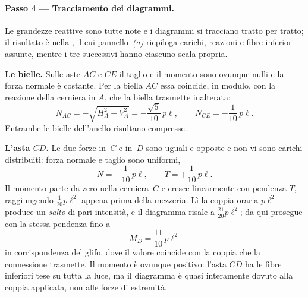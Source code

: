 \begin{esercizio}
\begin{svolgimento}


		
		\paragraph{Passo 4 --- Tracciamento dei diagrammi.}
		
		Le grandezze reattive sono tutte note e i diagrammi si tracciano tratto
		per tratto; il risultato è nella , il
		cui pannello~\emph{(a)} riepiloga carichi, reazioni e fibre inferiori
		assunte, mentre i tre successivi hanno ciascuno scala propria.
		
		\medskip\noindent\textbf{Le bielle.} Sulle aste $AC$ e $CE$ il taglio e il momento sono ovunque nulli e la
		forza normale è costante. Per la biella $AC$ essa coincide, in modulo,
		con la reazione della cerniera in $A$, che la biella trasmette
		inalterata:
		\[
		N_{AC} = -\sqrt{H_A^{2}+V_A^{2}} = -\frac{\sqrt5}{10}\,p\ell,
		\qquad
		N_{CE} = -\frac{1}{10}\,p\ell .
		\]
		Entrambe le bielle dell'anello risultano compresse.
		
		\medskip\noindent\textbf{L'asta $CD$.}
		Le due forze in~$C$ e in~$D$ sono uguali e opposte e non vi sono
		carichi distribuiti: forza normale e taglio sono uniformi,
		\[
		N = -\frac{1}{10}\,p\ell ,
		\qquad
		T = +\frac{1}{10}\,p\ell .
		\]
		Il momento parte da zero nella cerniera~$C$ e cresce linearmente
		con pendenza $T$, raggiungendo $\tfrac{1}{20}p\ell^{2}$ appena
		prima della mezzeria. Lì la coppia oraria $p\ell^{2}$ produce un
		\emph{salto} di pari intensità, e il diagramma risale a
		$\tfrac{21}{20}p\ell^{2}$; da qui prosegue con la stessa pendenza
		fino a
		\[
		M_D = \frac{11}{10}\,p\ell^{2}
		\]
		in corrispondenza del glifo, dove il valore coincide con la coppia
		che la connessione trasmette. Il momento è ovunque positivo:
		l'asta $CD$ ha le fibre inferiori tese su tutta la luce, ma il
		diagramma è quasi interamente dovuto alla coppia applicata, non
		alle forze di estremità.
		

\end{svolgimento}
\end{esercizio}
